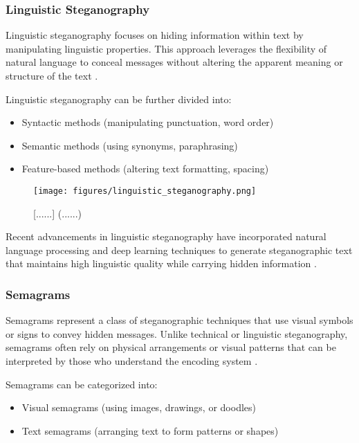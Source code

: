 \documentclass[12pt, a4paper, oneside]{book}
\begin{document}
\subsubsection{Linguistic Steganography}
Linguistic steganography focuses on hiding information within text by manipulating linguistic properties. This approach leverages the flexibility of natural language to conceal messages without altering the apparent meaning or structure of the text \cite{ShubhamPatel2020}.

Linguistic steganography can be further divided into:
\begin{itemize}[leftmargin=*]
    \item Syntactic methods (manipulating punctuation, word order)
    \item Semantic methods (using synonyms, paraphrasing)
    \item Feature-based methods (altering text formatting, spacing)
\end{itemize}

\begin{figure}[htbp]
    \centering
    \texttt{[image: figures/linguistic\_steganography.png]}
    \caption{[......] (......)}
    \label{fig:linguistic_stego}
\end{figure}

Recent advancements in linguistic steganography have incorporated natural language processing and deep learning techniques to generate steganographic text that maintains high linguistic quality while carrying hidden information \cite{GuptaSharma2022}.

\subsubsection{Semagrams}
Semagrams represent a class of steganographic techniques that use visual symbols or signs to convey hidden messages. Unlike technical or linguistic steganography, semagrams often rely on physical arrangements or visual patterns that can be interpreted by those who understand the encoding system \cite{JohnsonSmith2023}.

Semagrams can be categorized into:
\begin{itemize}[leftmargin=*]
    \item Visual semagrams (using images, drawings, or doodles)
    \item Text semagrams (arranging text to form patterns or shapes)
\end{itemize}
\end{document}
